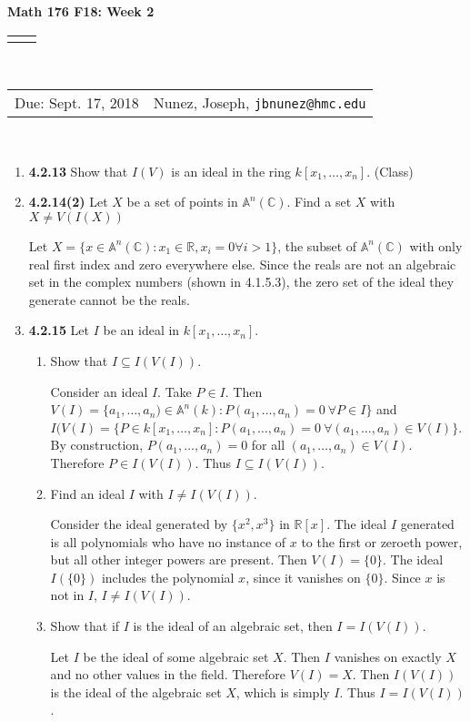 \documentclass[12pt]{article}
\renewcommand{\title}[1]{\textbf{#1}\\}
\renewcommand{\line}{\begin{tabularx}{\textwidth}{X>{\raggedleft}X}\hline\\\end{tabularx}\\[-0.5cm]}
\newcommand{\leftright}[2]{\begin{tabularx}{\textwidth}{X>{\raggedleft}X}#1%
& #2\\\end{tabularx}\\[-0.5cm]}
\newcommand{\R}{\mathbb{R}}
\newcommand{\C}{\mathbb{C}}
\newcommand{\A}{\mathbb{A}}
\begin{document}
\title{Math 176 F18: Week 2}
\line
\leftright{Due: Sept. 17, 2018}{Nunez, Joseph, \texttt{jbnunez@hmc.edu}} %



\begin{enumerate}
 
 	\item \textbf{4.2.13} Show that $I(V)$ is an ideal in the ring $k[x_1,\dots, x_n]$. (Class)
 	
 	

    \item \textbf{4.2.14(2)} Let $X$ be a set of points in $\A^n(\C)$.  Find a set $X$ with $X\neq V(I(X))$
    
    Let $X=\{ x\in \A^n(\C): x_1 \in \R, x_i = 0 \forall i>1\}$, the subset of $\A^n(\C)$ with only real first index and zero everywhere else.  Since the reals are not an algebraic set in the complex numbers (shown in 4.1.5.3), the zero set of the ideal they generate cannot be the reals.  
    
    \item \textbf{4.2.15}  Let $I$ be an ideal in $k[x_1,\dots, x_n]$. \begin{enumerate}
    \item Show that $I \subseteq I(V(I))$.
    
    Consider an ideal $I$.  Take $P\in I$.  
    Then $V(I) = \{a_1,\dots,a_n) \in \A^n(k): P(a_1,\dots,a_n)=0 ~\forall P\in I\}$ and $I(V(I) = \{P \in k[x_1,\dots, x_n]: P(a_1,\dots,a_n)=0 ~\forall (a_1,\dots,a_n)\in V(I)\}$.  By construction, $P(a_1,\dots,a_n)=0$ for all $(a_1,\dots,a_n)\in V(I)$.  Therefore $P\in I(V(I))$.  Thus $I \subseteq I(V(I))$.
    
    \item Find an ideal $I$ with $I\neq I(V(I))$.
    
    Consider the ideal generated by $\{x^2, x^3\}$ in $\R[x]$.  The ideal $I$ generated is all polynomials who have no instance of $x$ to the first or zeroeth power, but all other integer powers are present.  Then $V(I)=\{0\}$.  The ideal $I(\{0\})$ includes the polynomial $x$, since it vanishes on $\{0\}$.  Since $x$ is not in $I$, $I \neq I(V(I))$.
    
    \item Show that if $I$ is the ideal of an algebraic set, then $I=I(V(I))$.
    
    Let $I$ be the ideal of some algebraic set $X$.  Then $I$ vanishes on exactly $X$ and no other values in the field.  Therefore $V(I) = X$.  Then $I(V(I))$ is the ideal of the algebraic set $X$, which is simply $I$.  Thus $I=I(V(I))$.
    

\end{enumerate}
\end{enumerate}
\end{document}
